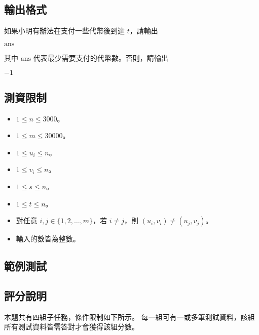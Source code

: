\subsection{輸出格式}

如果小明有辦法在支付一些代幣後到達 \(t\)，請輸出

\begin{format}
\f{
$\textrm{ans}$
}
\end{format}

\noindent 其中 \(\textrm{ans}\) 代表最少需要支付的代幣數。否則，請輸出

\begin{format}
\f{
$-1$
}
\end{format}

\subsection{測資限制}

\begin{itemize}
\tightlist
\item
  \(1 \le n \le 3000\)。
\item
  \(1 \le m \le 30000\)。
\item
  \(1 \le u_i \le n\)。
\item
  \(1 \le v_i \le n\)。
\item
  \(1 \le s \le n\)。
\item
  \(1 \le t \le n\)。
\item
  對任意 \(i, j \in \{1, 2, \ldots, m\}\)，若 \(i \ne j\)，則
  \((u_i, v_i) \ne (u_j, v_j)\)。
\item
  輸入的數皆為整數。
\end{itemize}

\subsection{範例測試}

\begin{example}
%
%
%
\end{example}

\subsection{評分說明}

本題共有四組子任務，條件限制如下所示。
每一組可有一或多筆測試資料，該組所有測試資料皆需答對才會獲得該組分數。


